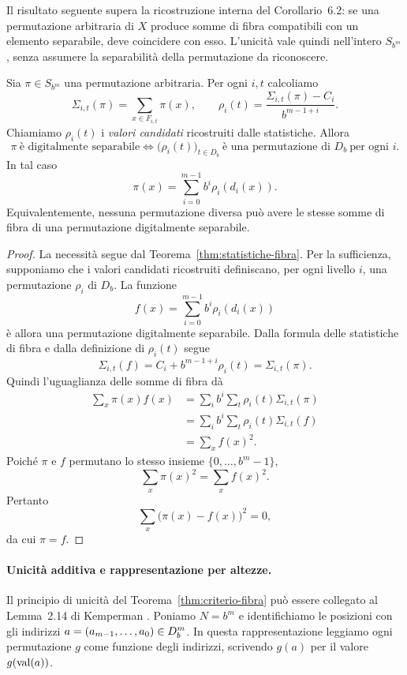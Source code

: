	Il risultato seguente supera la ricostruzione interna del Corollario~6.2:
	se una permutazione arbitraria di \(X\) produce somme di fibra compatibili
	con un elemento separabile, deve coincidere con esso. L'unicità vale quindi
	nell'intero \(S_{b^m}\), senza assumere la separabilità della permutazione
	da riconoscere.

	\begin{theorem}\label{thm:criterio-fibra}
		Sia \(\pi\in S_{b^m}\) una permutazione arbitraria. Per ogni \(i,t\)
		calcoliamo
		\[
		\Sigma_{i,t}(\pi)=\sum_{x\in F_{i,t}}\pi(x),
		\qquad
		\rho_i(t)=\frac{\Sigma_{i,t}(\pi)-C_i}{b^{m-1+i}}.
		\]
		Chiamiamo \(\rho_i(t)\) i \emph{valori candidati} ricostruiti dalle
		statistiche. Allora
		\[
		\boxed{
		\pi\ \text{è digitalmente separabile}
		\iff
		\bigl(\rho_i(t)\bigr)_{t\in D_b}
		\ \text{è una permutazione di }D_b
		\ \text{per ogni }i.
		}
		\]
		In tal caso
		\[
		\pi(x)=\sum_{i=0}^{m-1}b^i\rho_i(d_i(x)).
		\]
		Equivalentemente, nessuna permutazione diversa può avere le stesse
		somme di fibra di una permutazione digitalmente separabile.
	\end{theorem}

	\begin{proof}
		La necessità segue dal Teorema~\ref{thm:statistiche-fibra}. Per la
		sufficienza, supponiamo che i valori candidati ricostruiti definiscano, per
		ogni livello \(i\), una permutazione \(\rho_i\) di \(D_b\). La funzione
		\[
		f(x)=\sum_{i=0}^{m-1}b^i\rho_i(d_i(x))
		\]
		è allora una permutazione digitalmente separabile. Dalla formula delle
		statistiche di fibra e dalla definizione di \(\rho_i(t)\) segue
		\[
		\Sigma_{i,t}(f)
		=
		C_i+b^{m-1+i}\rho_i(t)
		=
		\Sigma_{i,t}(\pi).
		\]
		Quindi l'uguaglianza delle somme di fibra dà
		\[
		\begin{aligned}
		\sum_x\pi(x)f(x)
		&=\sum_i b^i\sum_t\rho_i(t)\Sigma_{i,t}(\pi)\\
		&=\sum_i b^i\sum_t\rho_i(t)\Sigma_{i,t}(f)\\
		&=\sum_x f(x)^2.
		\end{aligned}
		\]
		Poiché \(\pi\) e \(f\) permutano lo stesso insieme
		\(\{0,\dots,b^m-1\}\),
		\[
		\sum_x\pi(x)^2=\sum_x f(x)^2.
		\]
		Pertanto
		\[
		\sum_x\bigl(\pi(x)-f(x)\bigr)^2=0,
		\]
		da cui \(\pi=f\).
	\end{proof}

\paragraph*{Unicità additiva e rappresentazione per altezze.}
Il principio di unicità del Teorema~\ref{thm:criterio-fibra} può essere
collegato al Lemma~2.14 di Kemperman \cite[p.~282]{kemperman}.
Poniamo \(N=b^m\) e identifichiamo le posizioni con gli indirizzi
\(a=(a_{m-1},\ldots,a_0)\in D_b^m\). In questa rappresentazione leggiamo
ogni permutazione \(g\) come funzione degli indirizzi, scrivendo \(g(a)\)
per il valore \(g(\operatorname{val}(a))\).

